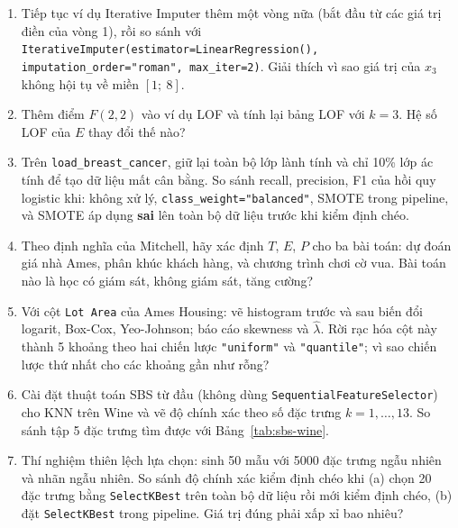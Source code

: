 \begin{enumerate}
    \item Tiếp tục ví dụ Iterative Imputer thêm một vòng nữa (bắt đầu từ các giá trị điền của vòng 1), rồi so sánh với \texttt{IterativeImputer(estimator=LinearRegression(), imputation\_order="roman", max\_iter=2)}. Giải thích vì sao giá trị của $x_3$ không hội tụ về miền $[1;\ 8]$.
    \item Thêm điểm $F(2, 2)$ vào ví dụ LOF và tính lại bảng LOF với $k = 3$. Hệ số LOF của $E$ thay đổi thế nào?
    \item Trên \texttt{load\_breast\_cancer}, giữ lại toàn bộ lớp lành tính và chỉ 10\% lớp ác tính để tạo dữ liệu mất cân bằng. So sánh recall, precision, F1 của hồi quy logistic khi: không xử lý, \texttt{class\_weight="balanced"}, SMOTE trong pipeline, và SMOTE áp dụng \textbf{sai} lên toàn bộ dữ liệu trước khi kiểm định chéo.
    \item Theo định nghĩa của Mitchell, hãy xác định $T$, $E$, $P$ cho ba bài toán: dự đoán giá nhà Ames, phân khúc khách hàng, và chương trình chơi cờ vua. Bài toán nào là học có giám sát, không giám sát, tăng cường?
    \item Với cột \texttt{Lot Area} của Ames Housing: vẽ histogram trước và sau biến đổi logarit, Box-Cox, Yeo-Johnson; báo cáo skewness và $\hat{\lambda}$. Rời rạc hóa cột này thành 5 khoảng theo hai chiến lược \texttt{"uniform"} và \texttt{"quantile"}; vì sao chiến lược thứ nhất cho các khoảng gần như rỗng?
    \item Cài đặt thuật toán SBS từ đầu (không dùng \texttt{SequentialFeatureSelector}) cho KNN trên Wine và vẽ độ chính xác theo số đặc trưng $k = 1, \dots, 13$. So sánh tập 5 đặc trưng tìm được với Bảng~\ref{tab:sbs-wine}.
    \item Thí nghiệm thiên lệch lựa chọn: sinh 50 mẫu với 5000 đặc trưng ngẫu nhiên và nhãn ngẫu nhiên. So sánh độ chính xác kiểm định chéo khi (a) chọn 20 đặc trưng bằng \texttt{SelectKBest} trên toàn bộ dữ liệu rồi mới kiểm định chéo, (b) đặt \texttt{SelectKBest} trong pipeline. Giá trị đúng phải xấp xỉ bao nhiêu?
\end{enumerate}

